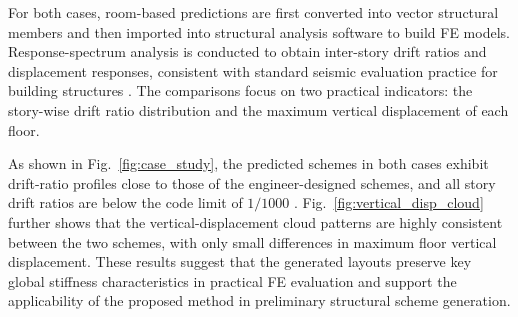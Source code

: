 For both cases, room-based predictions are first converted into vector structural members and then imported into structural analysis software to build FE models. Response-spectrum analysis is conducted to obtain inter-story drift ratios and displacement responses, consistent with standard seismic evaluation practice for building structures \cite{GB500112010Code2016,qianDesignTallBuilding2018}. The comparisons focus on two practical indicators: the story-wise drift ratio distribution and the maximum vertical displacement of each floor.





As shown in Fig.~\ref{fig:case_study}, the predicted schemes in both cases exhibit drift-ratio profiles close to those of the engineer-designed schemes, and all story drift ratios are below the code limit of $1/1000$ \cite{GB500112010Code2016}. Fig.~\ref{fig:vertical_disp_cloud} further shows that the vertical-displacement cloud patterns are highly consistent between the two schemes, with only small differences in maximum floor vertical displacement. These results suggest that the generated layouts preserve key global stiffness characteristics in practical FE evaluation and support the applicability of the proposed method in preliminary structural scheme generation.
